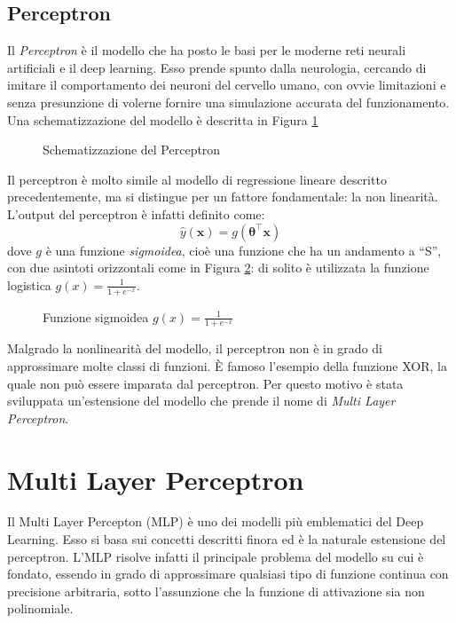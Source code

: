\documentclass{standalone}
\begin{document}
\subsection{Perceptron}
Il \emph{Perceptron} è il modello che ha posto le basi per le moderne reti
neurali artificiali e il deep learning. Esso prende spunto dalla neurologia,
cercando di imitare il comportamento dei neuroni del cervello umano, con ovvie
limitazioni e senza presunzione di volerne fornire una simulazione accurata del
funzionamento. Una schematizzazione del modello è descritta in Figura
\ref{fig:perceptron}
\begin{figure}[!htp]
  \caption{Schematizzazione del Perceptron}
  \label{fig:perceptron}
\end{figure}

Il perceptron è molto simile al modello di regressione lineare descritto
precedentemente, ma si distingue per un fattore fondamentale: la non linearità.
L'output del perceptron è infatti definito come:
$$\hat{y}(\bm x) = g(\bm \theta^\intercal \bm x)$$
dove $g$ è una funzione \emph{sigmoidea}, cioè una funzione che ha un andamento
a ``S'', con due asintoti orizzontali come in Figura \ref{fig:sigmoid}: di
solito è utilizzata la funzione logistica $\displaystyle g(x) = \frac{1}{1 + e^{-x}}$.
\begin{figure}[!htp]
  \caption{Funzione sigmoidea $\displaystyle g(x) = \frac{1}{1 + e^{-x}}$ }
  \label{fig:sigmoid}
\end{figure}

Malgrado la nonlinearità del modello, il perceptron non è in grado di
approssimare molte classi di funzioni. È famoso l'esempio della funzione XOR,
la quale non può essere imparata dal perceptron. Per questo motivo è stata
sviluppata un'estensione del modello che prende il nome di \emph{Multi Layer
  Perceptron}.
\section{Multi Layer Perceptron}
Il Multi Layer Percepton (MLP) è uno dei modelli più emblematici del Deep
Learning. Esso si basa sui concetti descritti finora ed è la naturale
estensione del perceptron. L'MLP risolve infatti il principale problema del
modello su cui è fondato, essendo in grado di approssimare qualsiasi tipo di
funzione continua con precisione arbitraria, sotto l'assunzione che la
funzione di attivazione sia non polinomiale\cite{universal-approximator}.
\end{document}
